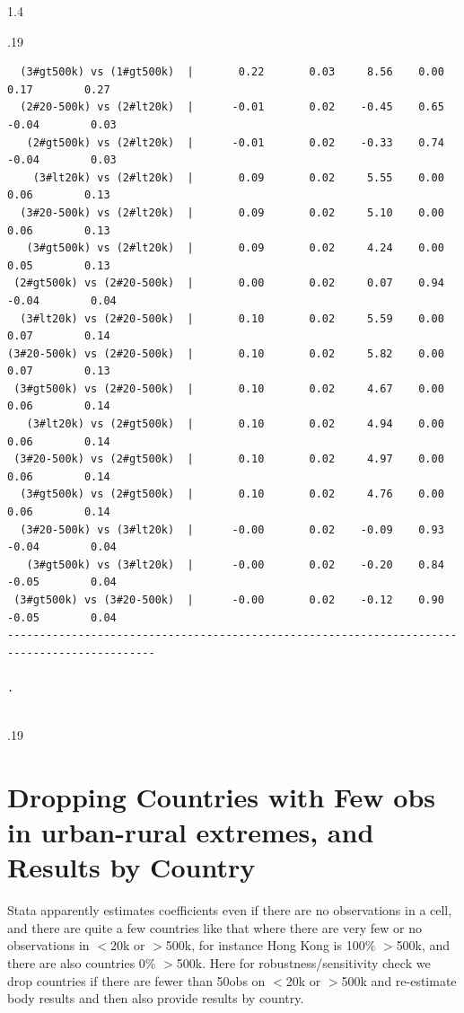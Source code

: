 \documentclass[10pt, letterpaper]{article}
\begin{document}
\begin{spacing}{1.4}
\begin{scriptsize}
\begin{spacing}{.19}
\begin{verbatim}
  (3#gt500k) vs (1#gt500k)  |       0.22       0.03     8.56    0.00         0.17        0.27
  (2#20-500k) vs (2#lt20k)  |      -0.01       0.02    -0.45    0.65        -0.04        0.03
   (2#gt500k) vs (2#lt20k)  |      -0.01       0.02    -0.33    0.74        -0.04        0.03
    (3#lt20k) vs (2#lt20k)  |       0.09       0.02     5.55    0.00         0.06        0.13
  (3#20-500k) vs (2#lt20k)  |       0.09       0.02     5.10    0.00         0.06        0.13
   (3#gt500k) vs (2#lt20k)  |       0.09       0.02     4.24    0.00         0.05        0.13
 (2#gt500k) vs (2#20-500k)  |       0.00       0.02     0.07    0.94        -0.04        0.04
  (3#lt20k) vs (2#20-500k)  |       0.10       0.02     5.59    0.00         0.07        0.14
(3#20-500k) vs (2#20-500k)  |       0.10       0.02     5.82    0.00         0.07        0.13
 (3#gt500k) vs (2#20-500k)  |       0.10       0.02     4.67    0.00         0.06        0.14
   (3#lt20k) vs (2#gt500k)  |       0.10       0.02     4.94    0.00         0.06        0.14
 (3#20-500k) vs (2#gt500k)  |       0.10       0.02     4.97    0.00         0.06        0.14
  (3#gt500k) vs (2#gt500k)  |       0.10       0.02     4.76    0.00         0.06        0.14
  (3#20-500k) vs (3#lt20k)  |      -0.00       0.02    -0.09    0.93        -0.04        0.04
   (3#gt500k) vs (3#lt20k)  |      -0.00       0.02    -0.20    0.84        -0.05        0.04
 (3#gt500k) vs (3#20-500k)  |      -0.00       0.02    -0.12    0.90        -0.05        0.04
---------------------------------------------------------------------------------------------

. 


\end{verbatim}
\end{spacing}{.19}
\end{scriptsize}

\section{Dropping Countries with Few obs in urban-rural extremes, and Results by Country}

Stata apparently estimates coefficients even if there are no observations in a
cell, and there are quite a few countries like that where there are very few or
no observations in $<$20k or $>$500k, for instance Hong Kong is 100\% $>$500k,
and there are also countries 0\% $>$500k. Here for robustness/sensitivity check
we drop countries if there are fewer than 50obs on $<$20k or $>$500k and
re-estimate body results and then also provide results by country. 


\end{spacing}
\end{document}
